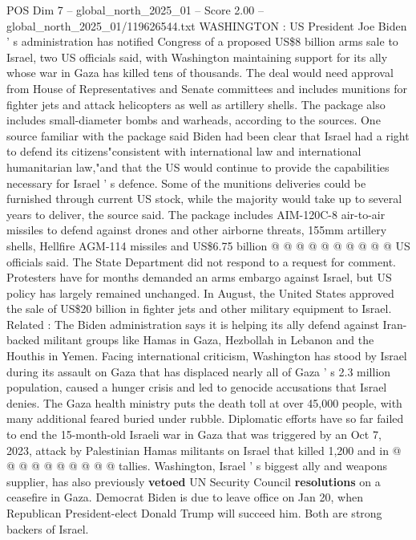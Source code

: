 \begin{textsample}{POS Dim 7 – global\_north\_2025\_01 – Score 2.00 – global\_north\_2025\_01/119626544.txt}  \label{ex:f7_pos_395}
WASHINGTON : US President Joe Biden ' s administration has notified Congress of a proposed US\$8 billion arms sale to Israel, two US officials said, with Washington maintaining support for its ally whose war in Gaza has killed tens of thousands.
The deal would need approval from House of Representatives and Senate committees and includes munitions for fighter jets and attack helicopters as well as artillery shells.
The package also includes small-diameter bombs and warheads, according to the sources.
One source familiar with the package said Biden had been clear that Israel had a right to defend its citizens"consistent with international law and international humanitarian law,"and that the US would continue to provide the capabilities necessary for Israel ' s defence.
Some of the munitions deliveries could be furnished through current US stock, while the majority would take up to several years to deliver, the source said.
The package includes AIM-120C-8 air-to-air missiles to defend against drones and other airborne threats, 155mm artillery shells, Hellfire AGM-114 missiles and US\$6.75 billion @ @ @ @ @ @ @ @ @ @ US officials said.
The State Department did not respond to a request for comment.
Protesters have for months demanded an arms embargo against Israel, but US policy has largely remained unchanged.
In August, the United States approved the sale of US\$20 billion in fighter jets and other military equipment to Israel.
Related : The Biden administration says it is helping its ally defend against Iran-backed militant groups like Hamas in Gaza, Hezbollah in Lebanon and the Houthis in Yemen.
Facing international criticism, Washington has stood by Israel during its assault on Gaza that has displaced nearly all of Gaza ' s 2.3 million population, caused a hunger crisis and led to genocide accusations that Israel denies.
The Gaza health ministry puts the death toll at over 45,000 people, with many additional feared buried under rubble.
Diplomatic efforts have so far failed to end the 15-month-old Israeli war in Gaza that was triggered by an Oct 7, 2023, attack by Palestinian Hamas militants on Israel that killed 1,200 and in @ @ @ @ @ @ @ @ @ @ tallies.
Washington, Israel ' s biggest ally and weapons supplier, has also previously \textbf{vetoed} UN Security Council \textbf{resolutions} on a ceasefire in Gaza.
Democrat Biden is due to leave office on Jan 20, when Republican President-elect Donald Trump will succeed him.
Both are strong backers of Israel.

\end{textsample}
